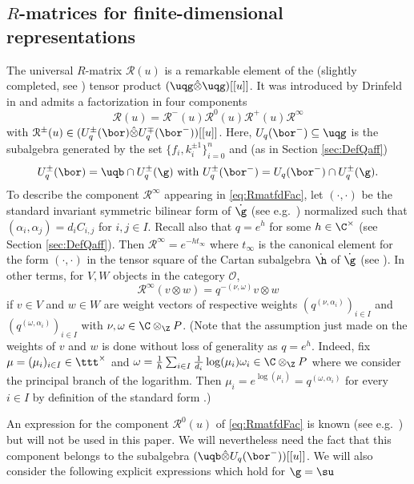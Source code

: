 \documentclass[11pt]{amsart}
\theoremstyle{definition}
\theoremstyle{remark}
\numberwithin{equation}{section}
\begin{document}
\subsection{$R$-matrices for finite-dimensional representations}\label{sec:Rdimfin} 
The universal $R$-matrix $\mathcal{R}(u)$ is a remarkable element of the (slightly completed, see \cite{hbourb}) tensor product $(\uqg\hat{\otimes}\uqg)[[u]]$. It was introduced by Drinfeld in \cite{dr2} and admits a factorization in four components
\begin{equation}\label{eq:RmatfdFac}
\mathcal{R}(u) = \mathcal{R}^-(u)\mathcal{R}^{0}(u)\mathcal{R}^+(u)\mathcal{R}^{\infty}
\end{equation}
with $\mathcal{R}^{\pm}(u) \in (U_q^{\pm}(\bor)\hat{\otimes}U_q^{\mp}(\bor^-))[[u]]$. Here, $U_q(\bor^-)\subseteq \uqg$ is the subalgebra generated by the set $\{f_i,k_i^{\pm 1}\}_{i=0}^n$ and (as in Section \ref{sec:DefQaff})
$$U_q^{\pm}(\bor)= \uqb\cap U_q^{\pm}(\g)  \text{ with }  U_q^{\pm}(\bor^-) = U_q(\bor^-)\cap U_q^{\pm}(\g).$$
To describe the component $\mathcal{R}^{\infty}$ appearing in \eqref{eq:RmatfdFac}, let $(\cdot,\cdot)$ be the standard invariant symmetric bilinear form of $\dot{\g}$ (see e.g.~\cite[Chapter 2]{kac}) normalized such that $(\alpha_i,\alpha_j)= d_iC_{i,j}$ for $i,j\in I$. Recall also that $q = e^h$ for some $h\in \C^{\times}$ (see Section \ref{sec:DefQaff}). Then 
$\mathcal{R}^{\infty}=e^{-ht_{\infty}}$
where $t_{\infty}$ is the canonical element for the form $(\cdot,\cdot)$ in the tensor square of the Cartan subalgebra $\dot{\h}$ of $\dot{\g}$ (see \cite{da1}). In other terms, for $V,W$ objects in the category $\mathcal{O}$,
$$ \mathcal{R}^{\infty}(v\otimes w) = q^{-(\nu,\omega)}v\otimes w$$
if $v \in V$ and $w \in W$ are weight vectors of respective weights $(q^{(\nu,\alpha_i)})_{i\in I}$ and $(q^{(\omega,\alpha_i)})_{i\in I}$ with $\nu,\omega \in \C\otimes_{\Z} P$. (Note that the assumption just made on the weights of $v$ and $w$ is done without loss of generality as $q=e^h$. Indeed, fix $\mu=(\mu_i)_{i\in I} \in \ttt^{\times}$ and $\omega = \frac{1}{h}\sum_{i\in I} \frac{1}{d_i}\log(\mu_i)\omega_i \in \C\otimes_{\Z} P$ where we consider the principal branch of the logarithm. Then $\mu_i = e^{\log(\mu_i)}= q^{(\omega,\alpha_i)}$ for every $i\in I$ by definition of the standard form \cite[Chapter 2]{kac}.) \par An expression for the component $\mathcal{R}^0(u)$ of \eqref{eq:RmatfdFac} is known (see e.g.~\cite[Section 7]{fh1}) but will not be used in this paper. We will nevertheless need the fact that this component belongs to the subalgebra $(\uqb\hat{\otimes}U_q(\bor^-))[[u]]$. We will also consider the following explicit expressions which hold for $\g =\su$
\end{document}
